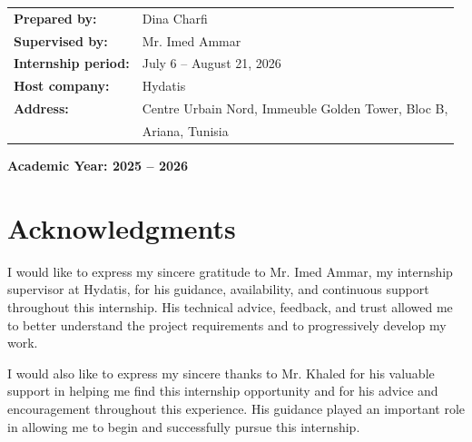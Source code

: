 \documentclass[12pt,a4paper]{report}
\begin{document}
\begin{titlepage}
\begin{center}
\begin{minipage}{0.78\textwidth}

\large

\renewcommand{\arraystretch}{1.5}

\begin{tabular}{@{}ll@{}}
\textbf{Prepared by:} & Dina Charfi \\
\textbf{Supervised by:} & Mr. Imed Ammar \\
\textbf{Internship period:} & July 6 -- August 21, 2026 \\
\textbf{Host company:} & Hydatis \\
\textbf{Address:} & Centre Urbain Nord, Immeuble Golden Tower, Bloc B, \\
& Ariana, Tunisia
\end{tabular}

\end{minipage}

\vfill

{\large \textbf{Academic Year: 2025 -- 2026} }

\end{center}

\end{titlepage}

\clearpage
\clearpage
{}

\chapter*{Acknowledgments}

I would like to express my sincere gratitude to Mr. Imed Ammar, my internship supervisor at Hydatis, for his guidance, availability, and continuous support throughout this internship. His technical advice, feedback, and trust allowed me to better understand the project requirements and to progressively develop my work.

I would also like to express my sincere thanks to Mr. Khaled for his valuable support in helping me find this internship opportunity and for his advice and encouragement throughout this experience. His guidance played an important role in allowing me to begin and successfully pursue this internship.
\end{document}
